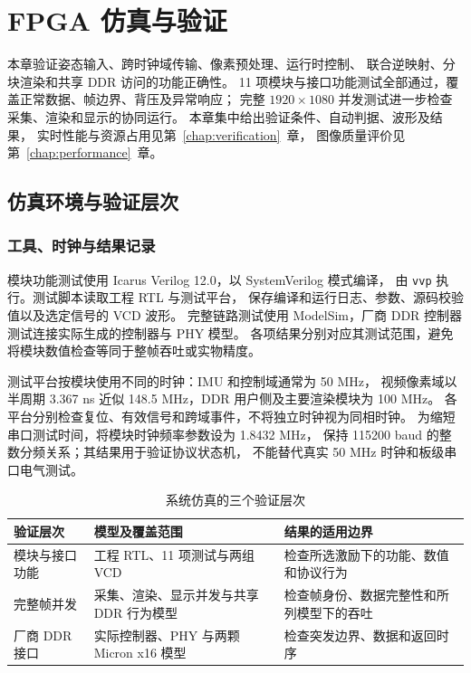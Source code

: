 \chapter{FPGA 仿真与验证}
\label{chap:control}
\label{chap:fpga-simulation}

本章验证姿态输入、跨时钟域传输、像素预处理、运行时控制、
联合逆映射、分块渲染和共享 DDR 访问的功能正确性。
11 项模块与接口功能测试全部通过，覆盖正常数据、帧边界、背压及异常响应；
完整 $1920\times1080$ 并发测试进一步检查采集、渲染和显示的协同运行。
本章集中给出验证条件、自动判据、波形及结果，
实时性能与资源占用见第~\ref{chap:verification}~章，
图像质量评价见第~\ref{chap:performance}~章。

\section{仿真环境与验证层次}
\subsection{工具、时钟与结果记录}
模块功能测试使用 Icarus Verilog 12.0，以 SystemVerilog 模式编译，
由 \texttt{vvp} 执行。测试脚本读取工程 RTL 与测试平台，
保存编译和运行日志、参数、源码校验值以及选定信号的 VCD 波形。
完整链路测试使用 ModelSim，厂商 DDR 控制器测试连接实际生成的控制器与 PHY 模型。
各项结果分别对应其测试范围，避免将模块数值检查等同于整帧吞吐或实物精度。

测试平台按模块使用不同的时钟：IMU 和控制域通常为 50 MHz，
视频像素域以半周期 3.367 ns 近似 148.5 MHz，DDR 用户侧及主要渲染模块为 100 MHz。
各平台分别检查复位、有效信号和跨域事件，不将独立时钟视为同相时钟。
 为缩短串口测试时间，将模块时钟频率参数设为 1.8432 MHz，
保持 115200 baud 的整数分频关系；其结果用于验证协议状态机，
不能替代真实 50 MHz 时钟和板级串口电气测试。

\begin{table}[htbp]\centering\small
\caption{系统仿真的三个验证层次}\label{tab:sim-evidence}
\begin{tabularx}{\textwidth}{>{\raggedright\arraybackslash}p{2.5cm}YY}
\toprule
验证层次 & 模型及覆盖范围 & 结果的适用边界 \\
\midrule
模块与接口功能 & 工程 RTL、11 项测试与两组 VCD & 检查所选激励下的功能、数值和协议行为 \\
完整帧并发 & 采集、渲染、显示并发与共享 DDR 行为模型 & 检查帧身份、数据完整性和所列模型下的吞吐 \\
厂商 DDR 接口 & 实际控制器、PHY 与两颗 Micron x16 模型 & 检查突发边界、数据和返回时序 \\
\bottomrule
\end{tabularx}
\end{table}

